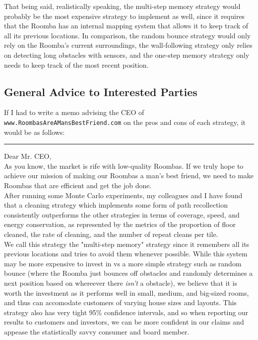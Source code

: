 \documentclass[11pt]{article}
\begin{document}
That being said, realistically speaking, the multi-step memory strategy
would probably be the most expensive strategy to implement as well,
since it requires that the Roomba has an internal mapping system that
allows it to keep track of all its previous locations. In comparison,
the random bounce strategy would only rely on the Roomba's current
surroundings, the wall-following strategy only relies on detecting long
obstacles with sensors, and the one-step memory strategy only needs to
keep track of the most recent position.

\subsection{General Advice to Interested Parties}

If I had to write a memo advising the CEO of \\\texttt{www.RoombasAreAMansBestFriend.com} on the pros and cons of each strategy, it would be as follows:

\rule{\textwidth}{0.4pt}

Dear Mr. CEO,\\

As you know, the market is rife with low-quality Roombas. If we truly
hope to achieve our mission of making our Roombas a man's best friend,
we need to make Roombas that are efficient and get the job done.\\

After running some Monte Carlo experiments, my colleagues and I have
found that a cleaning strategy which implements some form of path
recollection consistently outperforms the other strategies in terms of
coverage, speed, and energy conservation, as represented by the metrics
of the proportion of floor cleaned, the rate of cleaning, and the number
of repeat cleans per tile.\\

We call this strategy the "multi-step memory" strategy since it
remembers all its previous locations and tries to avoid them whenever
possible. While this system may be more expensive to invest in vs a more
simple strategy such as random bounce (where the Roomba just bounces off
obstacles and randomly determines a next position based on whereever
there \emph{isn't} a obstacle), we believe that it is worth the
investment as it performs well in small, medium, and big-sized rooms,
and thus can accomodate customers of varying house sizes and layouts.
This strategy also has very tight 95\% confidence intervals, and so when
reporting our results to customers and investors, we can be more
confident in our claims and appease the statistically savvy consumer and
board member.\\
\end{document}
